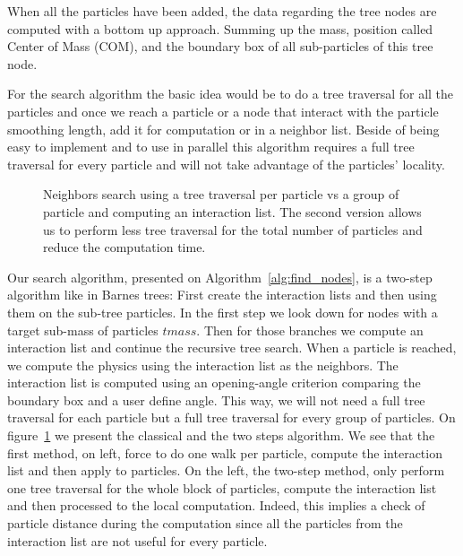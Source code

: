 When all the particles have been added, the data regarding the tree nodes are computed with a bottom up approach. 
Summing up the mass, position called Center of Mass (COM), and the boundary box of all sub-particles of this tree node.

For the search algorithm the basic idea would be to do a tree traversal for all the particles and once we reach a particle or a node that interact with the particle smoothing length, add it for computation or in a neighbor list. 
Beside of being easy to implement and to use in parallel this algorithm requires a full tree traversal for every particle and will not take advantage of the particles' locality.

\begin{figure}[ht!]
\centering

\caption[Neighbor search in the tree data structure]{Neighbors search using a tree traversal per particle vs a group of particle and computing an interaction list. The second version allows us to perform less tree traversal for the total number of particles and reduce the computation time.}
\label{fig:arbre}
\end{figure}

Our search algorithm, presented on Algorithm~\ref{alg:find_nodes}, is a two-step algorithm like in Barnes trees: First create the interaction lists and then using them on the sub-tree particles. 
In the first step we look down for nodes with a target sub-mass of particles $tmass$. 
Then for those branches we compute an interaction list and continue the recursive tree search. 
When a particle is reached, we compute the physics using the interaction list as the neighbors. 
The interaction list is computed using an opening-angle criterion comparing the boundary box and a user define angle. 
This way, we will not need a full tree traversal for each particle but a full tree traversal for every group of particles.
On figure~\ref{fig:arbre} we present the classical and the two steps algorithm. 
We see that the first method, on left, force to do one walk per particle, compute the interaction list and then apply to particles. 
On the left, the two-step method, only perform one tree traversal for the whole block of particles, compute the interaction list and then processed to the local computation. 
Indeed, this implies a check of particle distance during the computation since all the particles from the interaction list are not useful for every particle. 

